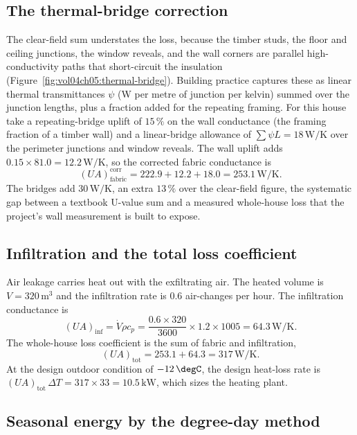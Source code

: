 \subsection{The thermal-bridge correction}

The clear-field sum understates the loss, because the timber studs, the
floor and ceiling junctions, the window reveals, and the wall corners are
parallel high-conductivity paths that short-circuit the insulation
(Figure~\ref{fig:vol04ch05:thermal-bridge}). Building practice captures
these as linear thermal transmittances $\psi$ (W per metre of junction per
kelvin) summed over the junction lengths, plus a fraction added for the
repeating framing. For this house take a repeating-bridge uplift of
$15\,\%$ on the wall conductance (the framing fraction of a timber wall)
and a linear-bridge allowance of $\sum \psi L = 18\,\text{W}/\si{\kelvin}$
over the perimeter junctions and window reveals. The wall uplift adds
$0.15 \times 81.0 = 12.2\,\text{W}/\si{\kelvin}$, so the corrected fabric
conductance is
\[
(UA)_{\text{fabric}}^{\text{corr}} = 222.9 + 12.2 + 18.0 =
253.1\,\text{W}/\si{\kelvin}.
\]
The bridges add $30\,\text{W}/\si{\kelvin}$, an extra $13\,\%$ over the
clear-field figure, the systematic gap between a textbook U-value sum and
a measured whole-house loss that the project's wall measurement is built to
expose.



\subsection{Infiltration and the total loss coefficient}

Air leakage carries heat out with the exfiltrating air. The heated volume
is $V = 320\,\text{m}^3$ and the infiltration rate is $0.6$ air-changes
per hour. The infiltration conductance is
\[
(UA)_{\text{inf}} = \dot{V}\rho c_p = \frac{0.6 \times 320}{3600} \times
1.2 \times 1005 = 64.3\,\text{W}/\si{\kelvin}.
\]
The whole-house loss coefficient is the sum of fabric and infiltration,
\[
(UA)_{\text{tot}} = 253.1 + 64.3 = 317\,\text{W}/\si{\kelvin}.
\]
At the design outdoor condition of $-12\,\degC$, the design heat-loss rate
is $(UA)_{\text{tot}}\,\Delta T = 317 \times 33 = 10.5\,\text{kW}$, which
sizes the heating plant.

\subsection{Seasonal energy by the degree-day method}

